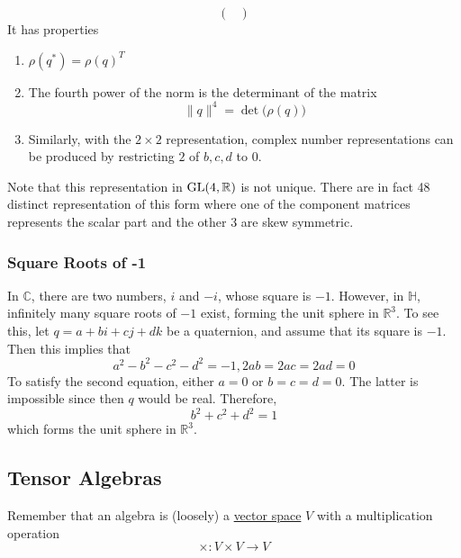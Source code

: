 \begin{theorem}
\begin{equation}
\begin{pmatrix}
    \end{pmatrix}
  \end{equation}
  It has properties
  \begin{enumerate}
    \item $\rho(q^*) = \rho(q)^T$
    \item The fourth power of the norm is the determinant of the matrix 
      \begin{equation}
        \|q\|^4 = \det\big( \rho (q)\big)
      \end{equation}
    \item Similarly, with the $2\times 2$ representation, complex number representations can be produced by restricting $2$ of $b, c, d$ to $0$. 
  \end{enumerate}
  \end{theorem}

  Note that this representation in $\operatorname{GL}(4, \mathbb{R})$ is not unique. There are in fact 48 distinct representation of this form where one of the component matrices represents the scalar part and the other 3 are skew symmetric. 

\subsubsection{Square Roots of -1}

  In $\mathbb{C}$, there are two numbers, $i$ and $-i$, whose square is $-1$. However, in $\mathbb{H}$, infinitely many square roots of $-1$ exist, forming the unit sphere in $\mathbb{R}^3$. To see this, let $q = a+bi+cj+dk$ be a quaternion, and assume that its square is $-1$. Then this implies that
  \begin{equation}
    a^2 - b^2 -c^2 -d^2 = -1, 2ab = 2ac = 2ad = 0
  \end{equation}
  To satisfy the second equation, either $a=0$ or $b=c=d=0$. The latter is impossible since then $q$ would be real. Therefore, 
  \begin{equation}
    b^2 + c^2 + d^2 = 1
  \end{equation}
  which forms the unit sphere in $\mathbb{R}^3$. 

\subsection{Tensor Algebras}

  Remember that an algebra is (loosely) a \hyperref[def:vector-space]{vector space} $V$ with a multiplication operation
  \begin{equation}
    \times: V \times V \to V
  \end{equation}

